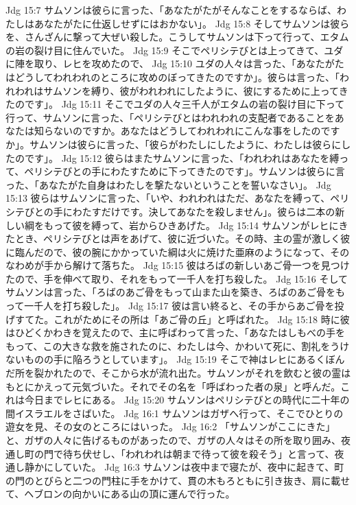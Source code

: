 Jdg 15:7  サムソンは彼らに言った、「あなたがたがそんなことをするならば、わたしはあなたがたに仕返しせずにはおかない」。
Jdg 15:8  そしてサムソンは彼らを、さんざんに撃って大ぜい殺した。こうしてサムソンは下って行って、エタムの岩の裂け目に住んでいた。
Jdg 15:9  そこでペリシテびとは上ってきて、ユダに陣を取り、レヒを攻めたので、
Jdg 15:10  ユダの人々は言った、「あなたがたはどうしてわれわれのところに攻めのぼってきたのですか」。彼らは言った、「われわれはサムソンを縛り、彼がわれわれにしたように、彼にするために上ってきたのです」。
Jdg 15:11  そこでユダの人々三千人がエタムの岩の裂け目に下って行って、サムソンに言った、「ペリシテびとはわれわれの支配者であることをあなたは知らないのですか。あなたはどうしてわれわれにこんな事をしたのですか」。サムソンは彼らに言った、「彼らがわたしにしたように、わたしは彼らにしたのです」。
Jdg 15:12  彼らはまたサムソンに言った、「われわれはあなたを縛って、ペリシテびとの手にわたすために下ってきたのです」。サムソンは彼らに言った、「あなたがた自身はわたしを撃たないということを誓いなさい」。
Jdg 15:13  彼らはサムソンに言った、「いや、われわれはただ、あなたを縛って、ペリシテびとの手にわたすだけです。決してあなたを殺しません」。彼らは二本の新しい綱をもって彼を縛って、岩からひきあげた。
Jdg 15:14  サムソンがレヒにきたとき、ペリシテびとは声をあげて、彼に近づいた。その時、主の霊が激しく彼に臨んだので、彼の腕にかかっていた綱は火に焼けた亜麻のようになって、そのなわめが手から解けて落ちた。
Jdg 15:15  彼はろばの新しいあご骨一つを見つけたので、手を伸べて取り、それをもって一千人を打ち殺した。
Jdg 15:16  そしてサムソンは言った、「ろばのあご骨をもって山また山を築き、ろばのあご骨をもって一千人を打ち殺した」。
Jdg 15:17  彼は言い終ると、その手からあご骨を投げすてた。これがためにその所は「あご骨の丘」と呼ばれた。
Jdg 15:18  時に彼はひどくかわきを覚えたので、主に呼ばわって言った、「あなたはしもべの手をもって、この大きな救を施されたのに、わたしは今、かわいて死に、割礼をうけないものの手に陥ろうとしています」。
Jdg 15:19  そこで神はレヒにあるくぼんだ所を裂かれたので、そこから水が流れ出た。サムソンがそれを飲むと彼の霊はもとにかえって元気づいた。それでその名を「呼ばわった者の泉」と呼んだ。これは今日までレヒにある。
Jdg 15:20  サムソンはペリシテびとの時代に二十年の間イスラエルをさばいた。
Jdg 16:1  サムソンはガザへ行って、そこでひとりの遊女を見、その女のところにはいった。
Jdg 16:2  「サムソンがここにきた」と、ガザの人々に告げるものがあったので、ガザの人々はその所を取り囲み、夜通し町の門で待ち伏せし、「われわれは朝まで待って彼を殺そう」と言って、夜通し静かにしていた。
Jdg 16:3  サムソンは夜中まで寝たが、夜中に起きて、町の門のとびらと二つの門柱に手をかけて、貫の木もろともに引き抜き、肩に載せて、ヘブロンの向かいにある山の頂に運んで行った。
